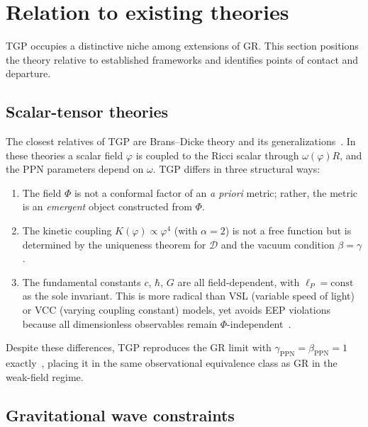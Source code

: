 
\section{Relation to existing theories}\label{sec:literature}

TGP occupies a distinctive niche among extensions of GR.
This section positions the theory relative to established
frameworks and identifies points of contact and departure.

\subsection{Scalar-tensor theories}

The closest relatives of TGP are Brans--Dicke theory and its
generalizations~\cite{Fujii2003,Damour1992}.  In these theories
a scalar field $\varphi$ is coupled to the Ricci scalar through
$\omega(\varphi) R$, and the PPN parameters depend on $\omega$.
TGP differs in three structural ways:
\begin{enumerate}[nosep]
  \item The field $\Phi$ is not a conformal factor of an
        \emph{a priori} metric; rather, the metric is an
        \emph{emergent} object constructed from $\Phi$.
  \item The kinetic coupling $K(\varphi)\propto\varphi^{4}$
        (with $\alpha=2$) is not a free function but is
        determined by the uniqueness theorem for $\mathcal{D}$
        and the vacuum condition $\beta=\gamma$.
  \item The fundamental constants $c$, $\hbar$, $G$ are all
        field-dependent, with $\ell_{P}=\mathrm{const}$ as the
        sole invariant.  This is more radical than VSL
        (variable speed of light) or VCC (varying coupling
        constant) models, yet avoids EEP violations because
        all dimensionless observables remain
        $\Phi$-independent~\cite{Uzan2011}.
\end{enumerate}

Despite these differences, TGP reproduces the GR limit with
$\gamma_{\mathrm{PPN}}=\beta_{\mathrm{PPN}}=1$
exactly~\cite{Will2014}, placing it in the same observational
equivalence class as GR in the weak-field regime.

\subsection{Gravitational wave constraints}

